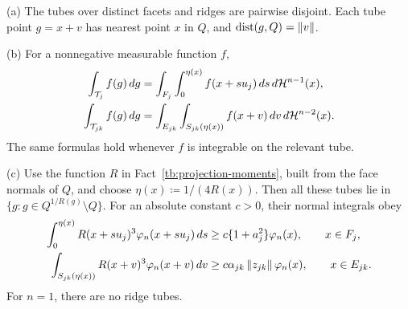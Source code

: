 \begin{fact}\label{tb:tubes}
(a) The tubes over distinct facets and ridges are pairwise disjoint.
Each tube point \(g=x+v\) has nearest point \(x\) in \(Q\), and
\(\operatorname{dist}(g,Q)=\left\lVert v\right\rVert\).

(b) For a nonnegative measurable function \(f\),
\begin{align*}
 \int_{\mathcal T_j}f(g)\,dg
 &=\int_{F_j}\int_0^{\eta(x)} f(x+s u_j)\,ds\,d\mathcal H^{n-1}(x),\\
 \int_{\mathcal T_{jk}}f(g)\,dg
 &=\int_{E_{jk}}\int_{S_{jk}(\eta(x))}f(x+v)\,dv\,d\mathcal H^{n-2}(x).
\end{align*}
The same formulas hold whenever \(f\) is integrable on the relevant tube.

(c) Use the function \(R\) in Fact~\ref{tb:projection-moments}, built
from the face normals of \(Q\), and choose \(\eta(x)\coloneqq 1/(4R(x))\).
Then all these tubes lie in \(\{g:g\in Q^{1/R(g)}\setminus Q\}\).
For an absolute constant \(c>0\), their normal integrals obey
\begin{align*}
 \int_0^{\eta(x)}R(x+s u_j)^3\varphi_n(x+s u_j)\,ds
 &\ge c\{1+a_j^2\}\varphi_n(x),\qquad x\in F_j,\\
 \int_{S_{jk}(\eta(x))}R(x+v)^3\varphi_n(x+v)\,dv
 &\ge c\alpha_{jk}\left\lVert z_{jk}\right\rVert\varphi_n(x),\qquad x\in E_{jk}.
\end{align*}
For \(n=1\), there are no ridge tubes.
\end{fact}

